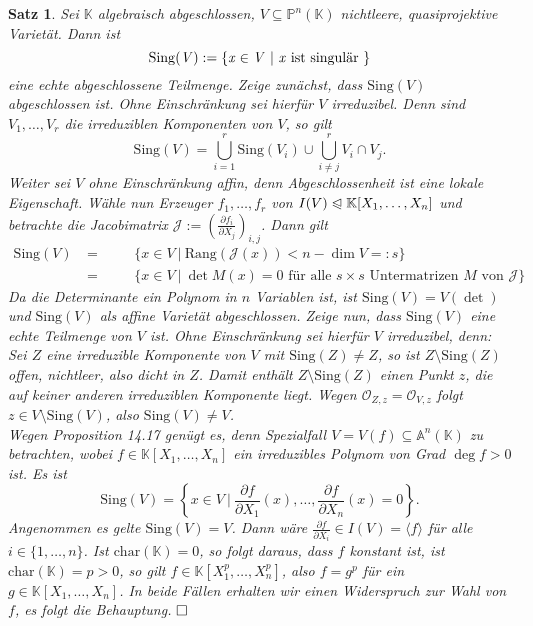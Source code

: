 \documentclass[11pt]{book}
\newtheorem{theorem}{Satz}[section]
\theoremstyle{nonumberbreak}
\newenvironment{pr}[1][]{\ifthenelse{\equal{#1}{}}{\proof}{\proof[#1]}\rm}{\endproof}
\begin{document}
\begin{spacing}{1.3}
\begin{theorem}
Sei $\mathbb{K}$ algebraisch abgeschlossen, $V \subseteq \mathbb{P}^n(\mathbb{K})$ nichtleere, quasiprojektive Varietät. Dann ist 
$$\rm{Sing}\it(V):= \{ x \in V \ \vert \ x \textrm{ ist singulär } \}$$
eine echte abgeschlossene Teilmenge.
\begin{pr}
Zeige zunächst, dass $\textrm{Sing}(V)$ abgeschlossen ist. Ohne Einschränkung sei hierfür $V$ irreduzibel. Denn sind $V_1, \ldots, V_r$ die irreduziblen Komponenten von $V$, so gilt
$$\textrm{Sing}(V) = \bigcup_{i=1}^r \textrm{Sing}(V_i) \cup \bigcup_{i\neq j}^r V_i \cap V_j.$$
Weiter sei $V$ ohne Einschränkung affin, denn Abgeschlossenheit ist eine lokale Eigenschaft. Wähle nun Erzeuger $f_1, \ldots, f_r$ von $I(V) \trianglelefteqslant \mathbb{K}[X_1, \ldots, X_n]$ und betrachte die Jacobimatrix $\mathcal{J}:= \left( \frac{\partial f_i}{\partial X_j} \right)_{i,j}$. Dann gilt
\begin{alignat*}{5}
\textrm{Sing}(V) \ &=&& \quad   \{x \in V \ \vert \ \textrm{Rang}( \mathcal{J}(x)) < n - \dim V =:s\}\\
 &=&& \quad  \{ x \in V \ \vert \ \det M(x) = 0 \textrm{ für alle } s \times s \textrm{ Untermatrizen } M \textrm{ von } \mathcal{J} \}
 \end{alignat*}
Da die Determinante ein Polynom in $n$ Variablen ist, ist $\textrm{Sing}(V)= V(\det)$ und $\textrm{Sing}(V)$ als affine Varietät abgeschlossen. 
Zeige nun, dass $\textrm{Sing}(V)$ eine echte Teilmenge von $V$ ist. Ohne Einschränkung sei hierfür $V$ irreduzibel, denn: Sei $Z$ eine irreduzible Komponente von $V$ mit $\textrm{Sing}(Z) \neq Z$, so ist $Z \setminus \textrm{Sing}(Z)$ offen, nichtleer, also dicht in $Z$. Damit enthält $Z \setminus \textrm{Sing}(Z)$ einen Punkt $z$, die auf keiner anderen irreduziblen Komponente liegt. Wegen $\mathcal{O}_{Z,z} = \mathcal{O}_{V,z}$ folgt $z \in V \setminus \textrm{Sing}(V)$, also $\textrm{Sing}(V) \neq V$. \\
Wegen Proposition 14.17 genügt es, denn Spezialfall $V = V(f) \subseteq \mathbb{A}^n(\mathbb{K})$ zu betrachten, wobei $f \in \mathbb{K}[X_1, \ldots, X_n]$ ein irreduzibles Polynom von Grad $\deg f >0$ ist. Es ist
$$\textrm{Sing}(V) = \left\{ x \in V \ \bigg\vert \ \frac{\partial f}{\partial X_1}(x), \ldots, \frac{\partial f}{\partial X_n}(x) = 0 \right\}.$$
Angenommen es gelte $\textrm{Sing}(V)=V$. Dann wäre $\frac{\partial f}{\partial X_i} \in I(V)= \langle f \rangle$ für alle $i \in \{1, \ldots, n \}$. Ist $\textrm{char}(\mathbb{K}) = 0$, so folgt daraus, dass $f$ konstant ist, ist $\textrm{char}(\mathbb{K})=p >0$, so gilt $f \in \mathbb{K}[X_1^p, \ldots, X_n^p]$, also $f=g^p$ für ein $g \in \mathbb{K}[X_1, \ldots, X_n]$. In beide Fällen erhalten wir einen Widerspruch zur Wahl von $f$, es folgt die Behauptung. $\hfill \Box$
\end{pr}
\end{theorem}













\end{spacing}
\end{document}
